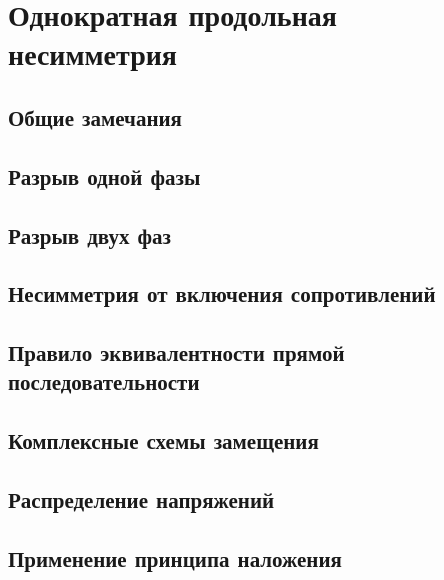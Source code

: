 \chapter{Однократная продольная несимметрия}
\label{chap:15}

\section{Общие замечания}
\label{sec:15-1}


\section{Разрыв одной фазы}
\label{sec:15-2}


\section{Разрыв двух фаз}
\label{sec:15-3}


\section{Несимметрия от включения сопротивлений}
\label{sec:15-4}


\section{Правило эквивалентности прямой последовательности}
\label{sec:15-5}


\section{Комплексные схемы замещения}
\label{sec:15-6}


\section{Распределение напряжений}
\label{sec:15-7}


\section{Применение принципа наложения}
\label{sec:15-8}